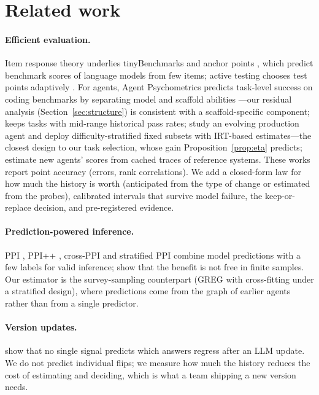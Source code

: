 \documentclass[11pt]{article}
\begin{document}
\section{Related work}
\paragraph{Efficient evaluation.} Item response theory \citep{rasch1960} underlies tinyBenchmarks
\citep{polo2024tiny} and anchor points \citep{vivek2024anchor}, which predict benchmark scores of language models from
few items; active testing chooses test points adaptively \citep{kossen2021active}. For agents, Agent Psychometrics
predicts task-level success on coding benchmarks by separating model and scaffold abilities
\citep{ge2026psychometrics}---our residual analysis (Section~\ref{sec:structure}) is consistent with a scaffold-specific
component; \citet{ndzomga2026efficient} keeps tasks with mid-range historical pass rates;
\citet{she2026production} study an evolving production agent and deploy difficulty-stratified fixed subsets with
IRT-based estimates---the closest design to our task selection, whose gain Proposition~\ref{prop:eta} predicts; \citet{johnson2026cached} estimate new agents' scores from cached traces of reference systems.
These works report point accuracy (errors, rank correlations). We add a closed-form law for how much the history is worth (anticipated from the type of change or estimated from the
probes), calibrated intervals that survive model failure, the keep-or-replace decision, and pre-registered evidence.

\paragraph{Prediction-powered inference.} PPI \citep{angelopoulos2023ppi}, PPI++ \citep{angelopoulos2023ppipp},
cross-PPI \citep{zrnic2024cross} and stratified PPI \citep{fisch2024stratified} combine model predictions with a few
labels for valid inference; \citet{mani2026nofreelunch} show that the benefit is not free in finite samples. Our
estimator is the survey-sampling counterpart (GREG with cross-fitting under a stratified design), where predictions
come from the graph of earlier agents rather than from a single predictor.

\paragraph{Version updates.} \citet{sheng2026regression} show that no single signal predicts which answers regress
after an LLM update. We do not predict individual flips; we measure how much the history reduces the cost of
estimating and deciding, which is what a team shipping a new version needs.
\end{document}
